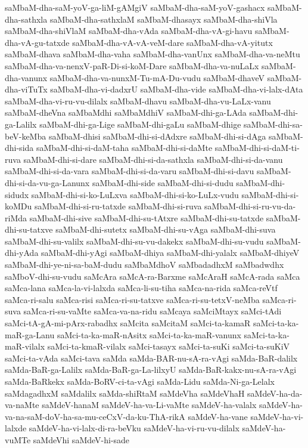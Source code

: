 {saMbaM-dha-saM-yoV-ga-liM-gAMgiV
saMbaM-dha-saM-yoV-gashacx
saMbaM-dha-sathxla
saMbaM-dha-sathxlaM
saMbaM-dhasayx
saMbaM-dha-shiVla
saMbaM-dha-shiVlaM
saMbaM-dha-vAda
saMbaM-dha-vA-gi-havu
saMbaM-dha-vA-gu-tatxde
saMbaM-dha-vA-vA-veM-dare
saMbaM-dha-vA-yitutx
saMbaM-dhava
saMbaM-dha-vaha
saMbaM-dha-vanUnx
saMbaM-dha-va-neMtu
saMbaM-dha-va-nenxV-paR-Di-si-koM-Dare
saMbaM-dha-va-nuLaLx
saMbaM-dha-vanunx
saMbaM-dha-va-nunxM-Tu-mA-Du-vudu
saMbaM-dhaveV
saMbaM-dha-viTuTx
saMbaM-dha-vi-dadxrU
saMbaM-dha-vide
saMbaM-dha-vi-lalx-dAta
saMbaM-dha-vi-ru-vu-dilalx
saMbaM-dhavu
saMbaM-dha-vu-LaLx-vanu
saMbaM-dheVna
saMbaMdhi
saMbaMdhiV
saMbaM-dhi-ga-LAda
saMbaM-dhi-ga-Lalilx
saMbaM-dhi-ga-Lige
saMbaM-dhi-gaLu
saMbaM-dhige
saMbaM-dhi-sa-beV-keMba
saMbaM-dhisi
saMbaM-dhi-si-dAdxre
saMbaM-dhi-si-dAga
saMbaM-dhi-sida
saMbaM-dhi-si-daM-taha
saMbaM-dhi-si-daMte
saMbaM-dhi-si-daM-ti-ruva
saMbaM-dhi-si-dare
saMbaM-dhi-si-da-sathxla
saMbaM-dhi-si-da-vanu
saMbaM-dhi-si-da-vara
saMbaM-dhi-si-da-varu
saMbaM-dhi-si-davu
saMbaM-dhi-si-da-vu-ga-Lanunx
saMbaM-dhi-side
saMbaM-dhi-si-dudu
saMbaM-dhi-sidudx
saMbaM-dhi-si-ko-LuLxva
saMbaM-dhi-si-ko-LuLx-vudu
saMbaM-dhi-si-koMDu
saMbaM-dhi-si-ru-tatxde
saMbaM-dhi-si-ruva
saMbaM-dhi-si-ru-vu-da-riMda
saMbaM-dhi-sive
saMbaM-dhi-su-tAtxre
saMbaM-dhi-su-tatxde
saMbaM-dhi-su-tatxve
saMbaM-dhi-sutetx
saMbaM-dhi-su-vAga
saMbaM-dhi-suva
saMbaM-dhi-su-valilx
saMbaM-dhi-su-vu-dakekx
saMbaM-dhi-su-vudu
saMbaM-dhi-yAda
saMbaM-dhi-yAgi
saMbaM-dhiya
saMbaM-dhi-yalalx
saMbaM-dhiyeV
saMbaM-dhi-ye-ni-sa-baM-dudu
saMbaMdhoV
saMbadadhxM
saMbadwdhx
saMboV-dhi-su-vudu
saMcAra
saMcA-ra-Barxme
saMcAraH
saMcA-rada
saMca
saMca-lana
saMca-la-vi-lalxda
saMca-li-su-tiha
saMca-na-rida
saMca-reVtf
saMca-ri-salu
saMca-risi
saMca-ri-su-tatxve
saMca-ri-su-tetxV-neMba
saMca-ri-suva
saMca-ri-su-vaMte
saMca-va-na-ridu
saMcaya
saMciMtayx
saMci-tAdi
saMci-tA-gA-mi-pArx-rabadhx
saMcita
saMcitaM
saMci-ta-kamaR
saMci-ta-ka-maR-ga-Lanu
saMci-ta-ka-maR-nAsitx
saMci-ta-ka-maR-vanunx
saMci-ta-ka-maR-vilalx
saMci-ta-kmaR-vilalx
saMci-tasayx
saMci-ta-suKi
saMci-ta-suKiV
saMci-ta-vAda
saMci-tava
saMda
saMda-BAR-nu-sA-ra-vAgi
saMda-BaR-dalilx
saMda-BaR-ga-Lalilx
saMda-BaR-ga-La-lilxyU
saMda-BaR-kakx-nu-sA-ra-vAgi
saMda-BaRkekx
saMda-BoRV-ci-ta-vAgi
saMda-Lidu
saMda-Ni-ga-Lelalx
saMdagadhxM
saMdalilx
saMda-shiRtaM
saMdeVha
saMdeVhaH
saMdeV-ha-da-va-naMte
saMdeV-hanaM
saMdeV-ha-va-Li-vaMte
saMdeV-ha-valalx
saMdeV-ha-va-na-saM-doV-ha-sa-mu-ceCxV-da-ku-ThA-rikA
saMdeV-ha-vane
saMdeV-ha-vi-lalxde
saMdeV-ha-vi-lalx-di-ra-beVku
saMdeV-ha-vi-ru-vu-dilalx
saMdeV-ha-vuMTe
saMdeVhi
saMdeV-hi-sade
}
